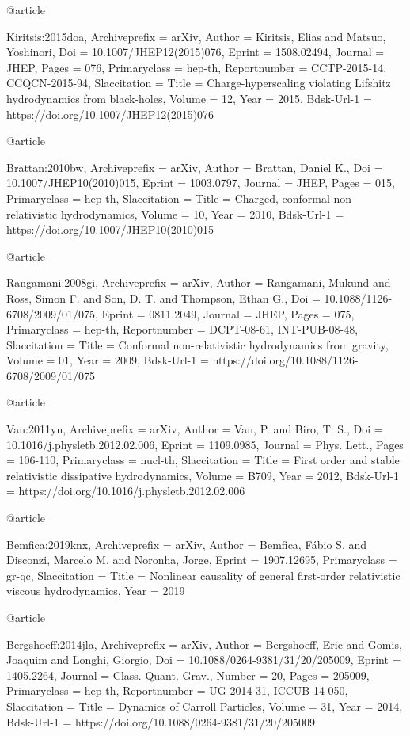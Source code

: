 \documentclass[superscriptaddress,prd,nofootinbib,preprintnumbers,longbibliography,11pt,eqsecnum]{revtex4-1}
\begin{document}
@article{Kiritsis:2015doa,
	Archiveprefix = {arXiv},
	Author = {Kiritsis, Elias and Matsuo, Yoshinori},
	Doi = {10.1007/JHEP12(2015)076},
	Eprint = {1508.02494},
	Journal = {JHEP},
	Pages = {076},
	Primaryclass = {hep-th},
	Reportnumber = {CCTP-2015-14, CCQCN-2015-94},
	Slaccitation = {Title = {{Charge-hyperscaling violating Lifshitz hydrodynamics from black-holes}},
	Volume = {12},
	Year = {2015},
	Bdsk-Url-1 = {https://doi.org/10.1007/JHEP12(2015)076}}

@article{Brattan:2010bw,
	Archiveprefix = {arXiv},
	Author = {Brattan, Daniel K.},
	Doi = {10.1007/JHEP10(2010)015},
	Eprint = {1003.0797},
	Journal = {JHEP},
	Pages = {015},
	Primaryclass = {hep-th},
	Slaccitation = {Title = {{Charged, conformal non-relativistic hydrodynamics}},
	Volume = {10},
	Year = {2010},
	Bdsk-Url-1 = {https://doi.org/10.1007/JHEP10(2010)015}}

@article{Rangamani:2008gi,
	Archiveprefix = {arXiv},
	Author = {Rangamani, Mukund and Ross, Simon F. and Son, D. T. and Thompson, Ethan G.},
	Doi = {10.1088/1126-6708/2009/01/075},
	Eprint = {0811.2049},
	Journal = {JHEP},
	Pages = {075},
	Primaryclass = {hep-th},
	Reportnumber = {DCPT-08-61, INT-PUB-08-48},
	Slaccitation = {Title = {{Conformal non-relativistic hydrodynamics from gravity}},
	Volume = {01},
	Year = {2009},
	Bdsk-Url-1 = {https://doi.org/10.1088/1126-6708/2009/01/075}}

@article{Van:2011yn,
	Archiveprefix = {arXiv},
	Author = {Van, P. and Biro, T. S.},
	Doi = {10.1016/j.physletb.2012.02.006},
	Eprint = {1109.0985},
	Journal = {Phys. Lett.},
	Pages = {106-110},
	Primaryclass = {nucl-th},
	Slaccitation = {Title = {{First order and stable relativistic dissipative hydrodynamics}},
	Volume = {B709},
	Year = {2012},
	Bdsk-Url-1 = {https://doi.org/10.1016/j.physletb.2012.02.006}}

@article{Bemfica:2019knx,
	Archiveprefix = {arXiv},
	Author = {Bemfica, F{\'a}bio S. and Disconzi, Marcelo M. and Noronha, Jorge},
	Eprint = {1907.12695},
	Primaryclass = {gr-qc},
	Slaccitation = {Title = {{Nonlinear causality of general first-order relativistic viscous hydrodynamics}},
	Year = {2019}}

@article{Bergshoeff:2014jla,
	Archiveprefix = {arXiv},
	Author = {Bergshoeff, Eric and Gomis, Joaquim and Longhi, Giorgio},
	Doi = {10.1088/0264-9381/31/20/205009},
	Eprint = {1405.2264},
	Journal = {Class. Quant. Grav.},
	Number = {20},
	Pages = {205009},
	Primaryclass = {hep-th},
	Reportnumber = {UG-2014-31, ICCUB-14-050},
	Slaccitation = {Title = {{Dynamics of Carroll Particles}},
	Volume = {31},
	Year = {2014},
	Bdsk-Url-1 = {https://doi.org/10.1088/0264-9381/31/20/205009}}

}}}}}}
\end{document}
